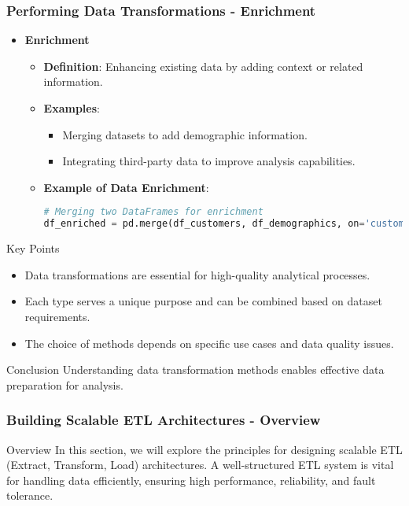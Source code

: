 \documentclass{beamer}
\begin{document}
\begin{frame}[fragile]
    \frametitle{Performing Data Transformations - Enrichment}
    \begin{itemize}
        \item \textbf{Enrichment}
            \begin{itemize}
                \item \textbf{Definition}: Enhancing existing data by adding context or related information.
                \item \textbf{Examples}:
                    \begin{itemize}
                        \item Merging datasets to add demographic information.
                        \item Integrating third-party data to improve analysis capabilities.
                    \end{itemize}
                \item \textbf{Example of Data Enrichment}:
                \begin{lstlisting}[language=Python]
# Merging two DataFrames for enrichment
df_enriched = pd.merge(df_customers, df_demographics, on='customer_id')
                \end{lstlisting}
            \end{itemize}
    \end{itemize}

    \begin{block}{Key Points}
        \begin{itemize}
            \item Data transformations are essential for high-quality analytical processes.
            \item Each type serves a unique purpose and can be combined based on dataset requirements.
            \item The choice of methods depends on specific use cases and data quality issues.
        \end{itemize}
    \end{block}

    \begin{block}{Conclusion}
        Understanding data transformation methods enables effective data preparation for analysis.
    \end{block}
\end{frame}

\begin{frame}[fragile]
    \frametitle{Building Scalable ETL Architectures - Overview}
    \begin{block}{Overview}
        In this section, we will explore the principles for designing scalable ETL (Extract, Transform, Load) architectures. A well-structured ETL system is vital for handling data efficiently, ensuring high performance, reliability, and fault tolerance.
    \end{block}
\end{frame}
\end{document}
